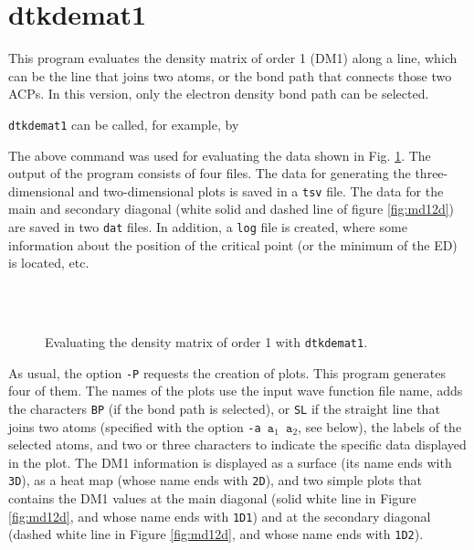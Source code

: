\section{dtkdemat1}

This program evaluates the density matrix of order 1 (DM1) along a line, which can be the line that joins two atoms, or the bond path that connects those two ACPs. In this version, only the electron density bond path can be selected. 

\texttt{dtkdemat1} can be called, for example, by\\

The above command was used for evaluating the data shown in Fig. \ref{fig:dtkdemat1usex}. The output of the program consists of four files. The data for generating the three-dimensional and two-dimensional plots is saved in a \texttt{tsv} file. The data for the main and secondary diagonal (white solid and dashed line of figure \ref{fig:md12d}) are saved in two \texttt{dat} files. In addition, a \texttt{log} file is created, where some information about the position of the critical point (or the minimum of the ED) is located, etc.
%
\begin{figure}[hb!]
\centering
{}\quad
{}\\
\quad
{}\\
\caption{Evaluating the density matrix of order 1 with \texttt{dtkdemat1}.}\label{fig:dtkdemat1usex}
\end{figure}
%

As usual, the option \texttt{-P} requests the creation of plots. This program generates four of them. The names of the plots use the input wave function file name, adds the characters \texttt{BP} (if the bond path is selected), or \texttt{SL} if the straight line that joins two atoms (specified with the option \texttt{-a $\mathtt{a}_1$ $\mathtt{a}_2$}, see below), the labels of the selected atoms, and two or three characters to indicate the specific data displayed in the plot. The DM1 information is displayed as a surface (its name ends with \texttt{3D}), as a heat map (whose name ends with \texttt{2D}), and two simple plots that contains the DM1 values at the main diagonal (solid white line in Figure \ref{fig:md12d}, and whose name ends with \texttt{1D1}) and at the secondary diagonal (dashed white line in Figure \ref{fig:md12d}, and whose name ends with \texttt{1D2}).

